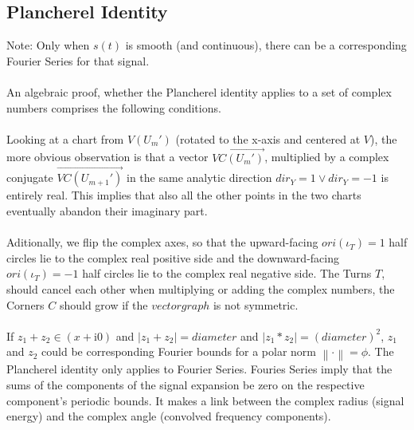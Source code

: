 \documentclass{report}
\newcommand\norm[1]{\left\lVert#1\right\rVert}
\begin{document}
\subsection{Plancherel Identity}
Note: Only when $s(t)$ is smooth (and continuous), there can be a corresponding Fourier Series for that signal.\\\\
An algebraic proof, whether the Plancherel identity applies to a set of complex numbers comprises the following conditions.\\\\
Looking at a chart from $V(U_{m}')$ (rotated to the x-axis and centered at $V$), the more obvious observation is that a vector $\overrightarrow{VC(U_{m}')}$, multiplied by a complex conjugate $\overrightarrow{VC(U_{m+1}')}$ in the same analytic direction $dir_{Y}=1\lor dir_{Y}=-1$ is entirely real. This implies that also all the other points in the two charts eventually abandon their imaginary part.\\\\
Aditionally, we flip the complex axes, so that the upward-facing $ori(\iota_{T})=1$ half circles lie to the complex real positive side and the downward-facing $ori(\iota_{T})=-1$ half circles lie to the complex real negative side. The Turns $T$, should cancel each other when multiplying or adding the complex numbers, the Corners $C$ should grow if the $vectorgraph$ is not symmetric.\\\\
If $z_{1}+z_{2}\in (x+\mathrm{i}0)$ and $\lvert z_{1}+z_{2}\rvert=diameter$ and $\lvert z_{1}*z_{2}\rvert=(diameter)^2$, $z_{1}$ and $z_{2}$ could be corresponding Fourier bounds for a polar norm $\norm{\cdot}=\phi$.
The Plancherel identity only applies to Fourier Series. Fouries Series imply that the sums of the components of the signal expansion be zero on the respective component's periodic bounds. It makes a link between the complex radius (signal energy) and the complex angle (convolved frequency components).
\end{document}
